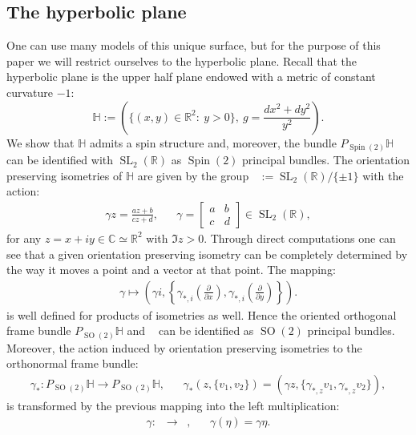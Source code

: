 \documentclass[12pt]{amsart}
\theoremstyle{definition}
\def\RR{{\mathbb R}}
\def\CC{{\mathbb C}}
\def\HH{{\mathbb{H}}}
\def\g{{\gamma}}
\DeclareMathOperator{\psl}{PSL_2(\mathbb{R})}
\newcommand{\slinear}{\operatorname{SL}}
\newcommand{\so}{\operatorname{SO}}
\newcommand{\spin}{\operatorname{Spin}}
\begin{document}
\subsection{The hyperbolic plane}
One can use many models of this unique surface, but for the purpose of this paper we will restrict ourselves to the hyperbolic plane. Recall that the hyperbolic plane is the upper half plane endowed with a metric of constant curvature $-1$:
\[
\HH := \left( \{ (x,y)\in \RR^2 : \ y>0 \}, \ g=\frac{dx^2+ dy^2}{y^2} \right).
\]
We show that $\HH$ admits a spin structure and, moreover, the bundle $P_{\spin(2)}\HH$ can be identified with $\slinear_2(\RR)$ as $\spin(2)$ principal bundles. The orientation preserving isometries of $\HH$ are given by the group $\psl := \slinear_2(\RR) / \{\pm 1 \}$ with the action:
\begin{align*}
\g z = \frac{az+b}{cz+d}, && \g= \begin{bmatrix} a & b \\
                                                                                  c & d   \end{bmatrix} \in \slinear_2(\RR),
\end{align*}
for any $z = x+iy\in \CC \simeq \RR^2$ with $\Im z >0$. Through direct computations one can see that a given orientation preserving isometry can be completely determined by the way it moves a point and a vector at that point. The mapping:
\begin{align}\label{pslTangenSpaceIdentification}
\g \mapsto \left( \g i, \left\{ \g_{*,i} \left( \frac{\partial}{\partial x} \right) ,\g_{*,i} \left( \frac{\partial}{\partial y} \right) \right\} \right).
\end{align} is well defined for products of isometries as well. Hence the oriented orthogonal frame bundle $P_{\so(2)}\HH$ and $\psl$ can be identified as $\so(2)$ principal bundles. Moreover, the action induced by orientation preserving isometries to the orthonormal frame bundle:
\begin{align*}
\g_*:P_{\so (2)}\HH\longrightarrow P_{\so (2)}\HH, && 
\g_*\left(z, \{ v_1, v_2 \} \right) = \left( \g z, \{ \g_{*,z}v_1, \g_{*,z}v_2 \} \right),
\end{align*}
is transformed by the previous mapping into the left multiplication:
\begin{align*}
\g:\psl \longrightarrow \psl, && 
\g(\eta) = \g \eta.
\end{align*}
\end{document}
